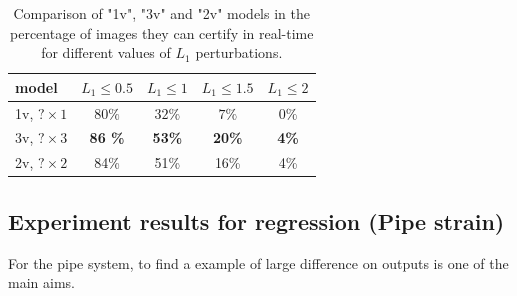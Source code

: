 \documentclass[letterpaper]{article} %
\begin{document}
\begin{table}[h!]
	\begin{tabular}{|l|c|c|c|c|}\hline\hline
		model &    $L_1\leq 0.5$ & $L_1\leq 1$ & $L_1\leq 1.5$ &  $L_1\leq 2$ \\\hline \hline
		1v, $? \times 1$ & $80 \%$ & $32\%$ & $7\%$ & $0\%$ \\\hline
		3v, $? \times 3$ & {\bf 86 \%} & {\bf 53\%} & {\bf 20\%} & {\bf 4\%} \\\hline
		2v, $? \times 2$ & 84\% & 51\% & 16\% & 4\% \\\hline \hline
	\end{tabular}
	\caption{Comparison of "1v", "3v" and "2v" models 
	in the percentage of images they can certify in real-time for different values of $L_1$ perturbations.}
\end{table}


	


\subsection{Experiment results for regression (Pipe strain)}
	
	For the pipe system, to find a example of large difference on outputs is one of the main aims.
\end{document}
